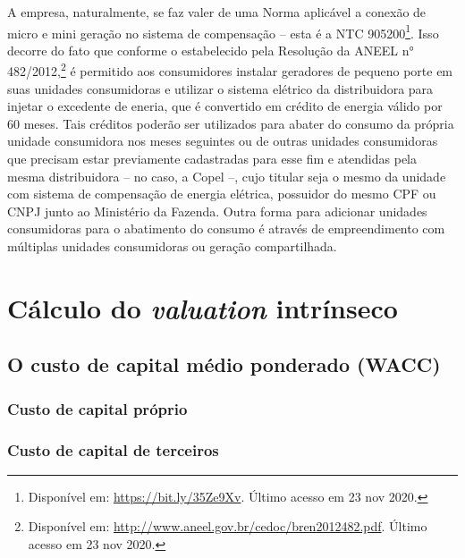 \documentclass[grad,numbers]{coppe}
\begin{document}
  A empresa, naturalmente, se faz valer de uma Norma aplicável a conexão de micro e mini geração no sistema de compensação -- esta é a NTC 905200\footnote{Disponível em: \url{https://bit.ly/35Ze9Xv}. Último acesso em 23 nov 2020.}. Isso decorre do fato que conforme o estabelecido pela Resolução da ANEEL n° 482/2012,\footnote{Disponível em: \url{http://www.aneel.gov.br/cedoc/bren2012482.pdf}. Último acesso em 23 nov 2020.} é permitido aos consumidores instalar geradores de pequeno porte em suas unidades consumidoras e utilizar o sistema elétrico da distribuidora para injetar o excedente de eneria, que é convertido em crédito de energia válido por 60 meses. Tais créditos poderão ser utilizados para abater do consumo da própria unidade consumidora nos meses seguintes ou de outras unidades consumidoras que precisam estar previamente cadastradas para esse fim e atendidas pela mesma distribuidora -- no caso, a Copel --, cujo titular seja o mesmo da unidade com sistema de compensação de energia elétrica, possuidor do mesmo CPF ou CNPJ junto ao Ministério da Fazenda. Outra forma para adicionar unidades consumidoras para o abatimento do consumo é através de empreendimento com múltiplas unidades consumidoras ou geração compartilhada.

  \hypertarget{cuxe1lculo-do-valuation-intruxednseco}{%
  \section{\texorpdfstring{Cálculo do \emph{valuation} intrínseco}{Cálculo do valuation intrínseco}}\label{cuxe1lculo-do-valuation-intruxednseco}}

  \hypertarget{o-custo-de-capital-muxe9dio-ponderado-wacc}{%
  \subsection{O custo de capital médio ponderado (WACC)}\label{o-custo-de-capital-muxe9dio-ponderado-wacc}}

  \hypertarget{custo-de-capital-pruxf3prio}{%
  \subsubsection{Custo de capital próprio}\label{custo-de-capital-pruxf3prio}}

  \hypertarget{custo-de-capital-de-terceiros}{%
  \subsubsection{Custo de capital de terceiros}\label{custo-de-capital-de-terceiros}}
\end{document}
